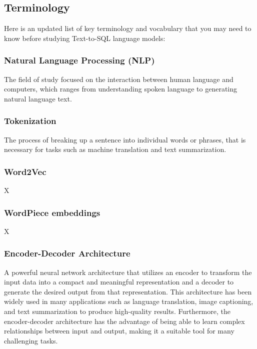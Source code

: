 \subsection{Terminology}

Here is an updated list of key terminology and vocabulary that you may need to know before studying Text-to-SQL language models:

\subsubsection{Natural Language Processing (NLP)}

The field of study focused on the interaction between human language and computers, which ranges from understanding spoken language to generating natural language text.

\subsubsection{Tokenization}

The process of breaking up a sentence into individual words or phrases, that is necessary for tasks such as machine translation and text summarization.

\subsubsection{Word2Vec}

X\cite{DBLP:journals/corr/Rong14}

\subsubsection{WordPiece embeddings}

X\cite{DBLP:journals/corr/WuSCLNMKCGMKSJL16}

\subsubsection{Encoder-Decoder Architecture}

A powerful neural network architecture that utilizes an encoder\cite{cho-etal-2014-learning} to transform the input data into a compact and meaningful representation and a decoder to generate the desired output from that representation. This architecture has been widely used in many applications such as language translation, image captioning, and text summarization to produce high-quality results. Furthermore, the encoder-decoder architecture has the advantage of being able to learn complex relationships between input and output, making it a suitable tool for many challenging tasks.

